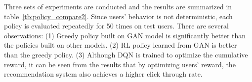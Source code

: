 \documentclass{article} %
\begin{document}
Three sets of experiments are conducted and the results are summarized in table~\ref{tb:policy_compare2}. Since users' behavior is not deterministic, each policy is evaluated repeatedly for 50 times on test users. There are several observations: (1) Greedy policy built on GAN model is significantly better than the policies built on other models. (2) RL policy learned from GAN is better than the greedy policy. (3) Although DQN is trained to optimize the cumulative reward, it can be seen from the results that by optimizing users' reward, the recommendation system also achieves a higher click through rate.

\begin{table}[ht!]
\vspace{-1mm}
\begin{center}
    \caption{{\small Results of recommendation performances based on different user models.}}
\label{tb:policy_compare2}
\vspace{-3mm}
\end{center}
\vspace{-3mm}
\end{table}
\end{document}
